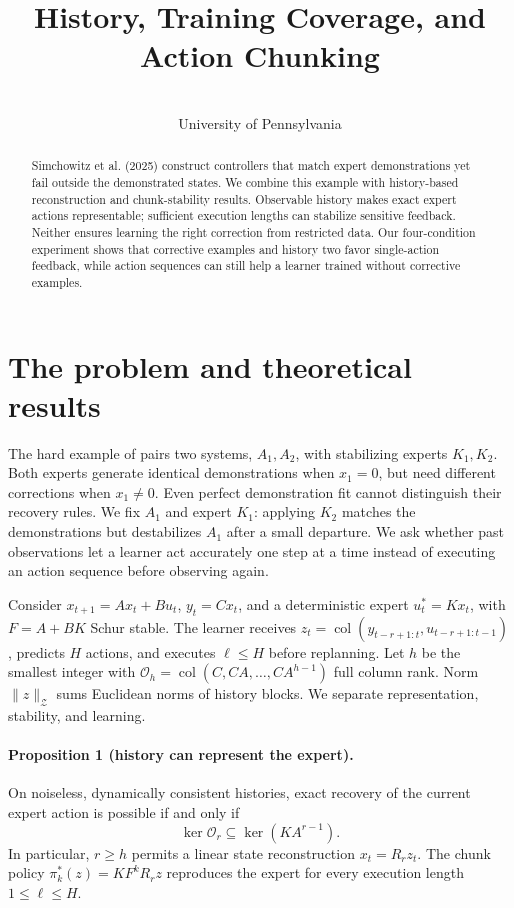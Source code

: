 \documentclass{l4dc2026}
\title[History, Coverage, and Chunking]{History, Training Coverage, and Action Chunking}
\author{\Name{Nihar Ballamudi}\and\Name{Kyle Horton}\\\addr University of Pennsylvania}
\newcommand{\norm}[1]{\lVert#1\rVert}
\newcommand{\col}{\operatorname{col}}
\begin{document}
\maketitle
\begin{abstract}
Simchowitz et al. (2025) construct controllers that match expert demonstrations yet fail outside the demonstrated states. We combine this example with history-based reconstruction and chunk-stability results. Observable history makes exact expert actions representable; sufficient execution lengths can stabilize sensitive feedback. Neither ensures learning the right correction from restricted data. Our four-condition experiment shows that corrective examples and history two favor single-action feedback, while action sequences can still help a learner trained without corrective examples.
\end{abstract}

\section{The problem and theoretical results}
The hard example of \citet{simchowitz2025} pairs two systems, $A_1,A_2$, with stabilizing experts $K_1,K_2$. Both experts generate identical demonstrations when $x_1=0$, but need different corrections when $x_1\ne0$. Even perfect demonstration fit cannot distinguish their recovery rules. We fix $A_1$ and expert $K_1$: applying $K_2$ matches the demonstrations but destabilizes $A_1$ after a small departure. We ask whether past observations let a learner act accurately one step at a time instead of executing an action sequence before observing again.

Consider $x_{t+1}=Ax_t+Bu_t$, $y_t=Cx_t$, and a deterministic expert $u_t^*=Kx_t$, with $F=A+BK$ Schur stable. The learner receives $z_t=\col(y_{t-r+1:t},u_{t-r+1:t-1})$, predicts $H$ actions, and executes $\ell\le H$ before replanning. Let $h$ be the smallest integer with $\mathcal O_h=\col(C,CA,\ldots,CA^{h-1})$ full column rank. Norm $\norm{z}_{\mathcal Z}$ sums Euclidean norms of history blocks. We separate representation, stability, and learning.

\paragraph{Proposition 1 (history can represent the expert).}
On noiseless, dynamically consistent histories, exact recovery of the current expert action is possible if and only if
\[
\ker\mathcal O_r\subseteq\ker(KA^{r-1}).
\]
In particular, $r\ge h$ permits a linear state reconstruction $x_t=R_rz_t$. The chunk policy $\pi_k^*(z)=KF^kR_rz$ reproduces the expert for every execution length $1\le\ell\le H$.
\end{document}

